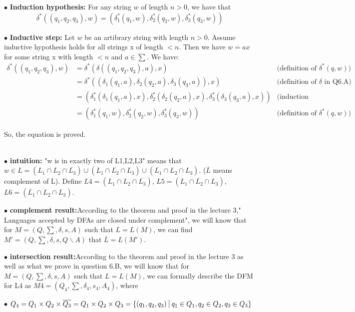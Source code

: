 \documentclass[12pt,a4paper]{article}
\newcommand{\question}[1]{\bigskip\noindent{\textbf{Q{#1} solution}}}
\begin{document}
$\bullet$ \textbf{Induction hypothesis:} For any string $w$ of length $n > 0$, we have that
\begin{equation*}
  \delta^*((q_1,q_2,q_3),w) = (\delta_1^*(q_1,w), \delta_2^*(q_2,w), \delta_3^*(q_3,w))
\end{equation*}

$\bullet$ \textbf{Inductive step:} Let $w$ be an artibrary string with length $n > 0$. Assume inductive hypothesis holds for all strings x of length $< n$. Then we have $w = ax$ for some string x with length $< n$ and $a \in \sum$. We have:
\begin{align*}
  \delta^*((q_1,q_2,q_3),w) &= \delta^*(\delta((q_1,q_2,q_3), a), x) &\mbox{(definition of $\delta^*(q,w)$) }\\
      &= \delta^*((\delta_1(q_1,a), \delta_2(q_2,a), \delta_3(q_3,a)), x) &\mbox{(definition of $\delta$ in Q6.A)}\\
      &= (\delta_1^*(\delta_1(q_1,a), x),\delta_2^*(\delta_2(q_2,a), x),\delta_3^*(\delta_3(q_3,a), x)) &\mbox{(induction hypothesis)}\\
      &= (\delta_1^*(q_1,w), \delta_2^*(q_2,w), \delta_3^*(q_3,w)) &\mbox{(definition of $\delta^*(q,w)$) }
\end{align*}

So, the equation is proved.


\question{6.C}\\

	$\bullet$ \textbf{intuition:} "w is in exactly two of {L1,L2,L3}" means that $w \in L = (L_1 \cap L_2 \cap \overline{L_3}) \cup ( L_1 \cap \overline{L_2} \cap L_3) \cup (\overline{L_1} \cap L_2 \cap L_3)$. ($\overline{L}$ means complement of L). Define $L4=(L_1 \cap L_2 \cap \overline{L_3})$, $L5=( L_1 \cap \overline{L_2} \cap L_3)$, $L6 = (\overline{L_1} \cap L_2 \cap L_3)$.


	$\bullet$ \textbf{complement result:}According to the theorem and proof in the lecture 3," Languages accepted by DFAs are closed under complement", we will know that for $M = (Q,\sum,\delta,s,A)$ such that $L=L(M)$, we can find $M' = (Q,\sum,\delta,s,Q \backslash A)$ that $\overline{L}=L(M')$. 


	$\bullet$ \textbf{intersection result:}According to the theorem and proof in the lecture 3 as well as what we prove in question 6.B, we will know that for $M = (Q,\sum,\delta,s,A)$ such that $L=L(M)$, we can formally describe the DFM for L4 as  $M4 = (Q_{4},\sum,\delta_{4},s_{4},A_{4})$, where

	$\bullet$ $Q_4 = Q_1 \times Q_2 \times \overline{Q_3} =  Q_1 \times Q_2 \times Q_3 =\{(q_1,q_2,q_3)\ \vline\ q_1 \in Q_1, q_2 \in Q_2, q_3 \in Q_3\}$
\end{document}
